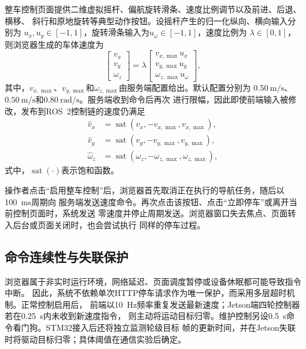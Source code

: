 整车控制页面提供二维虚拟摇杆、偏航旋转滑条、速度比例调节以及前进、后退、横移、
斜行和原地旋转等典型动作按钮。设摇杆产生的归一化纵向、横向输入分别为
$u_x,u_y\in[-1,1]$，旋转滑条输入为$u_\omega\in[-1,1]$，速度比例为
$\lambda\in[0,1]$，则浏览器生成的车体速度为
\begin{equation}
    \begin{bmatrix}
        v_x\\v_y\\\omega_z
    \end{bmatrix}
    =
    \lambda
    \begin{bmatrix}
        v_{x,\max}u_x\\
        v_{y,\max}u_y\\
        \omega_{z,\max}u_\omega
    \end{bmatrix},
    \label{eq:web-normalized-command}
\end{equation}
其中，$v_{x,\max}$、$v_{y,\max}$和$\omega_{z,\max}$由服务端配置给出。默认配置分别为
$0.50~\mathrm{m/s}$、$0.50~\mathrm{m/s}$和$0.80~\mathrm{rad/s}$。服务端收到命令后再次
进行限幅，因此即使前端输入被修改，发布到ROS~2控制链的速度仍满足
\begin{equation}
\begin{aligned}
    \hat v_x &= \operatorname{sat}(v_x,-v_{x,\max},v_{x,\max}),\\
    \hat v_y &= \operatorname{sat}(v_y,-v_{y,\max},v_{y,\max}),\\
    \hat\omega_z &= \operatorname{sat}(\omega_z,-\omega_{z,\max},\omega_{z,\max}),
\end{aligned}
\label{eq:web-server-saturation}
\end{equation}
式中，$\operatorname{sat}(\cdot)$表示饱和函数。

操作者点击“启用整车控制”后，浏览器首先取消正在执行的导航任务，随后以100~ms周期向
服务端发送速度命令。再次点击该按钮、点击“立即停车”或离开当前控制页面时，系统发送
零速度并停止周期发送。浏览器窗口失去焦点、页面转入后台或页面关闭时，也会尝试执行
同样的停车过程。

\subsection{命令连续性与失联保护}

浏览器属于非实时运行环境，网络延迟、页面调度暂停或设备休眠都可能导致指令中断。
因此，系统不依赖单次HTTP停车请求作为唯一保护，而采用多层超时机制。正常控制启用后，
前端以10~Hz频率重复发送最新速度；Jetson端四轮控制器若在0.25~s内未收到新速度指令，
则主动将运动目标归零。维护控制另设0.5~s命令看门狗。STM32接入后还将独立监测轮级目标
帧的更新时间，并在Jetson失联时将驱动目标归零；具体阈值在通信实验后确定。

